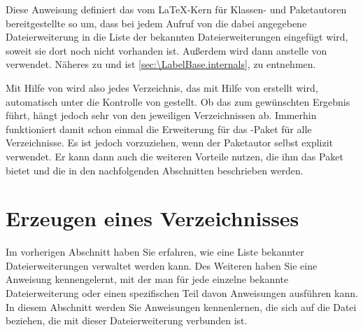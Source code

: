 \begin{Declaration}
\end{Declaration}
Diese Anweisung definiert das vom \LaTeX-Kern für Klassen- und Paketautoren
bereitgestellte
\important{\Macro{\@starttoc}} so um,
dass bei jedem Aufruf von  die dabei angegebene
Dateierweiterung in die Liste der bekannten Dateierweiterungen eingefügt wird,
soweit sie dort noch nicht vorhanden ist. Außerdem wird dann
 anstelle von 
verwendet. Näheres zu  und
 ist \autoref{sec:\LabelBase.internals},
 zu entnehmen.

Mit Hilfe von  wird also jedes Verzeichnis, das mit
Hilfe von  erstellt wird, automatisch unter die Kontrolle von
 gestellt. Ob das zum gewünschten Ergebnis führt, hängt
jedoch sehr von den jeweiligen Verzeichnissen ab. Immerhin funktioniert damit
schon einmal die Erweiterung für das -Paket für alle
Verzeichnisse. Es ist jedoch vorzuziehen, wenn der Paketautor selbst
 explizit verwendet. Er kann dann auch die weiteren Vorteile
nutzen, die ihm das Paket bietet und die in den nachfolgenden Abschnitten
beschrieben werden.%
\EndIndexGroup


\section{Erzeugen eines Verzeichnisses}

Im vorherigen Abschnitt haben Sie erfahren, wie eine Liste bekannter
Dateierweiterungen verwaltet werden kann. Des Weiteren haben Sie eine Anweisung kennengelernt, mit der man
für jede einzelne bekannte Dateierweiterung oder einen spezifischen Teil davon
Anweisungen ausführen kann. In diesem Abschnitt werden Sie Anweisungen
kennenlernen, die sich auf die Datei beziehen, die mit dieser Dateierweiterung
verbunden ist.


